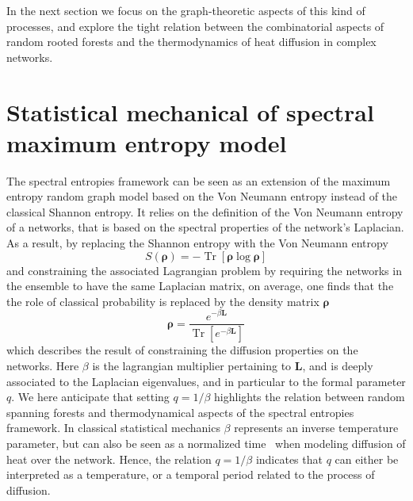 \documentclass[10pt,aps,pre,twocolumn,nofootinbib,superscriptaddress,longbibliography]{revtex4-1}
\newcommand{\brho}{\boldsymbol \rho}
\newcommand{\bL}{\mathbf{L}}
\newcommand{\Tr}[1]{\operatorname{Tr}\left\lbrack #1\right\rbrack}
\begin{document}
In the next section we focus on the graph-theoretic aspects of this kind of processes, and explore the tight relation between the combinatorial aspects of random rooted forests and the thermodynamics of heat diffusion in complex networks.

%

\section{Statistical mechanical of spectral maximum entropy model}
The spectral entropies framework can be seen as an extension of the maximum entropy random graph model based on the Von Neumann entropy instead of the classical Shannon entropy.
It relies on the definition of the Von Neumann entropy of a networks, that is based on the spectral properties of the network's Laplacian.
As a result, by replacing the Shannon entropy with the Von Neumann entropy~\cite{dedomenico2016b,nicolini2018}
\begin{equation}\label{eq:vonneumann_entropy}
S(\brho) = - \Tr{\brho \log \brho}
\end{equation}
and constraining the associated Lagrangian problem by requiring the networks in the ensemble to have the same Laplacian matrix, on average, one finds that the the role of classical probability is replaced by the density matrix $\brho$
\begin{equation}\label{eq:density_matrix}
\brho = \frac{e^{-\beta \bL}}{\Tr{e^{-\beta \bL}}}
\end{equation}
which describes the result of constraining the diffusion properties on the networks.
Here $\beta$ is the lagrangian multiplier pertaining to $\bL$, and is deeply associated to the Laplacian eigenvalues, and in particular to the formal parameter $q$. We here anticipate that setting $q=1/\beta$ highlights the relation between random spanning forests and thermodynamical aspects of the spectral entropies framework.
In classical statistical mechanics $\beta$ represents an inverse temperature parameter, but can also be seen as a normalized time~\cite{nicolini2018} when modeling diffusion of heat over the network.
Hence, the relation $q=1/\beta$ indicates that $q$ can either be interpreted as a temperature, or a temporal period related to the process of diffusion.
\end{document}

